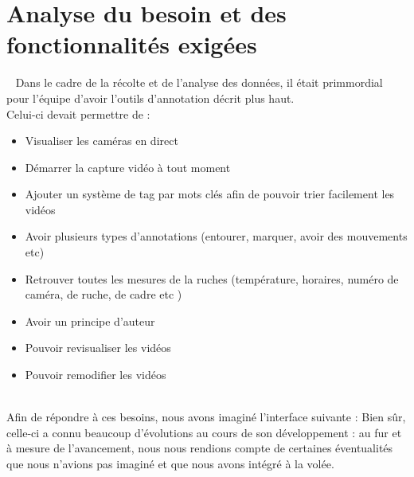 \documentclass[11pt,french,a4paper]{report}
\begin{document}
    \section{Analyse du besoin et des fonctionnalités exigées} 
Dans le cadre de la récolte et de l'analyse des données, il était primmordial pour l'équipe d'avoir l'outils d'annotation décrit plus haut. \\
Celui-ci devait permettre de : \\
\begin{itemize}
    \item Visualiser les caméras en direct
    \item Démarrer la capture vidéo à tout moment 
    \item Ajouter un système de tag par mots clés afin de pouvoir trier facilement les vidéos 
    \item Avoir plusieurs types d'annotations (entourer, marquer, avoir des mouvements etc) 
    \item Retrouver toutes les mesures de la ruches (température, horaires, numéro de caméra, de ruche, de cadre etc )  
    \item Avoir un principe d'auteur 
    \item Pouvoir revisualiser les vidéos 
    \item Pouvoir remodifier les vidéos 
\end{itemize} \\
Afin de répondre à ces besoins, nous avons imaginé l'interface suivante : 
Bien sûr, celle-ci a connu beaucoup d'évolutions au cours de son développement : au fur et à mesure de l'avancement, nous nous rendions compte
de certaines éventualités que nous n'avions pas imaginé et que nous avons intégré à la volée.  \\
\end{document}
